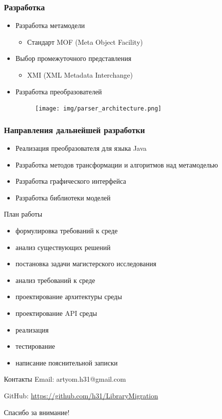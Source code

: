\documentclass[12pt]{beamer}
\begin{document}
\begin{frame}
\frametitle{Разработка}

\begin{itemize}
    \item Разработка метамодели
        \begin{itemize}
            \item Стандарт MOF (Meta Object Facility)
        \end{itemize}
    \item Выбор промежуточного представления
        \begin{itemize}
            \item XMI (XML Metadata Interchange)
        \end{itemize}
    \item Разработка преобразователей
        \begin{figure}[h!]
            \begin{center}
                \texttt{[image: img/parser\_architecture.png]}
            \end{center}
        \end{figure}
\end{itemize}

\end{frame}

\begin{frame}
\frametitle{Направления дальнейшей разработки}

\begin{itemize}
    \item Реализация преобразователя для языка Java
    \item Разработка методов трансформации и алгоритмов над метамоделью
    \item Разработка графического интерфейса
    \item Разработка библиотеки моделей
\end{itemize}
\end{frame}

\begin{frame}{План работы}
    \begin{itemize}
        \item[\checkmark] формулировка требований к среде
        \item[\checkmark] анализ существующих решений
        \item[\checkmark] постановка задачи магистерского исследования
        \item[\checkmark] анализ требований к среде
        \item[\checkmark] проектирование архитектуры среды
        \item проектирование API среды
        \item реализация
        \item тестирование
        \item написание пояснительной записки
    \end{itemize}
\end{frame}

\begin{frame}[t]{Контакты}
	Email: artyom.h31@gmail.com
	
	GitHub: \url{https://github.com/h31/LibraryMigration}
	
	\vspace{1cm}
	\begin{center}
		\Large
		Спасибо за внимание!
	\end{center}
\end{frame}
\end{document}
